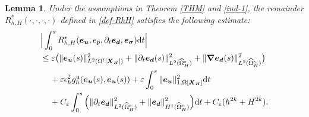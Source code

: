 \documentclass[11pt,reqno]{amsart}
\theoremstyle{definition}
\theoremstyle{plain}
\newtheorem{lemma}{Lemma}[section]
\numberwithin{theorem}{section}
\numberwithin{proposition}{section}
\numberwithin{lemma}{section}
\numberwithin{equation}{section}
\newcommand{\bs}[1]{\boldsymbol{#1}}
\newcommand{\uu}[1]  {{\bs{#1}} }
\newcommand{\dep}{{{\bs{d}}}}
\newcommand{\grad}   { \uu{\nabla}    }
\def\d{\mathrm{d}}
\renewcommand{\(}{\bigl(}
\renewcommand{\)}{\bigr)}
\begin{document}
\begin{lemma}\label{Lemma:RhH-2}
Under the assumptions in Theorem \ref{THM} and \eqref{ind-1}, the remainder $R_{h,H}^*(\cdot,\cdot,\cdot,\cdot)$ defined in \eqref{def-RhH} satisfies the following estimate: 
\begin{align}
&\Big|\int_0^s R_{h,H}^*({\bs e}_{\bs u}, e_p, \partial_t{\bs e}_{\bs d}, {\bs e}_{\bs\sigma}) \d t\Big| \notag\\
&\le \varepsilon
\big(\|{\bs e}_{\bs u}(s)\|_{L^2(\Omega^{\rm f}[\bs X_H])}^2 + \|\partial_t{\bs e}_\dep(s)\|_{L^2(\widehat{\Omega}^{\rm s}_H)}^2 + \|\grad{\bs e}_\dep(s)\|_{L^2(\widehat{\Omega}^{\rm s}_H)}^2 \big) \notag\\
&\quad\, 
+ \varepsilon \epsilon_h^2 g^{\rm u}_h({\bs e}_{\bs u}(s),{\bs e}_{\bs u}(s))  +  \varepsilon\int_0^s \| {\bs e}_{\bs u}  \|_{1,\Omega[{\bs X}_H]}^2  \d t \notag\\
&\quad\,
+ C_\varepsilon \int_0^s \Big( \|\partial_t{\bs e}_\dep\|_{L^2(\widehat{\Omega}^{\rm s}_H)}^2 + \|{\bs e}_\dep\|_{H^1(\widehat{\Omega}^{\rm s}_H)}^2 \Big)  \d t 
+ C_\varepsilon(h^{2k} + H^{2k}) .  
\end{align}
\end{lemma}
\end{document}
